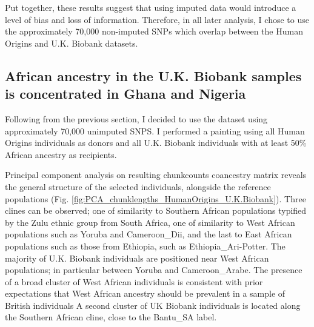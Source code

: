 Put together, these results suggest that using imputed data would introduce a level of bias and loss of information. Therefore, in all later analysis, I chose to use the approximately 70,000 non-imputed SNPs which overlap between the Human Origins and U.K. Biobank datasets. 

\subsection{African ancestry in the U.K. Biobank samples is concentrated in Ghana and Nigeria}

Following from the previous section, I decided to use the dataset using approximately 70,000 unimputed SNPS. I performed a painting using all Human Origins individuals as donors and all U.K. Biobank individuals with at least 50\% African ancestry as recipients.

Principal component analysis on resulting chunkcounts coancestry matrix reveals the general structure of the selected individuals, alongside the reference populations (Fig. \ref{fig:PCA_chunklengths_HumanOrigins_U.K.Biobank}). Three clines can be observed; one of similarity to Southern African populations typified by the Zulu ethnic group from South Africa, one of similarity to West African populations such as Yoruba and Cameroon\_Dii, and the last to East African populations such as those from Ethiopia, such as Ethiopia\_Ari-Potter. The majority of U.K. Biobank individuals are positioned near West African populations; in particular between Yoruba and Cameroon\_Arabe. The presence of a broad cluster of West African individuals is consistent with prior expectations that West African ancestry should be prevalent in a sample of British individuals A second cluster of UK Biobank individuals is located along the Southern African cline, close to the Bantu\_SA label. 

